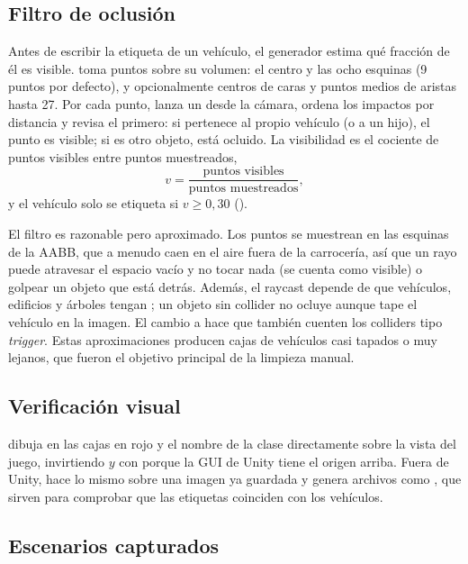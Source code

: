 \documentclass[11pt,a4paper]{article}
\begin{document}
\subsection{Filtro de oclusión}

Antes de escribir la etiqueta de un vehículo, el generador estima qué fracción de él es visible.  toma puntos sobre su volumen: el centro y las ocho esquinas (9 puntos por defecto), y opcionalmente centros de caras y puntos medios de aristas hasta 27. Por cada punto,  lanza un  desde la cámara, ordena los impactos por distancia y revisa el primero: si pertenece al propio vehículo (o a un hijo), el punto es visible; si es otro objeto, está ocluido. La visibilidad es el cociente de puntos visibles entre puntos muestreados,
\[
v = \frac{\text{puntos visibles}}{\text{puntos muestreados}},
\]
y el vehículo solo se etiqueta si $v \ge 0{,}30$ ().

El filtro es razonable pero aproximado. Los puntos se muestrean en las esquinas de la AABB, que a menudo caen en el aire fuera de la carrocería, así que un rayo puede atravesar el espacio vacío y no tocar nada (se cuenta como visible) o golpear un objeto que está detrás. Además, el raycast depende de que vehículos, edificios y árboles tengan ; un objeto sin collider no ocluye aunque tape el vehículo en la imagen. El cambio a  hace que también cuenten los colliders tipo \emph{trigger}. Estas aproximaciones producen cajas de vehículos casi tapados o muy lejanos, que fueron el objetivo principal de la limpieza manual.

\subsection{Verificación visual}

 dibuja en  las cajas en rojo y el nombre de la clase directamente sobre la vista del juego, invirtiendo $y$ con  porque la GUI de Unity tiene el origen arriba. Fuera de Unity,  hace lo mismo sobre una imagen ya guardada y genera archivos como , que sirven para comprobar que las etiquetas coinciden con los vehículos.

\subsection{Escenarios capturados}
\end{document}

